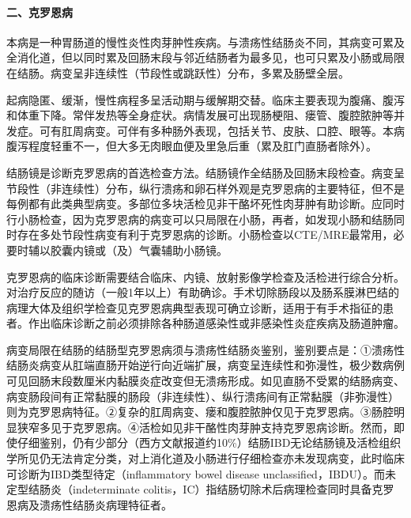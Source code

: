 \paragraph{二、克罗恩病}

本病是一种胃肠道的慢性炎性肉芽肿性疾病。与溃疡性结肠炎不同，其病变可累及全消化道，但以同时累及回肠末段与邻近结肠者为最多见，也可只累及小肠或局限在结肠。病变呈非连续性（节段性或跳跃性）分布，多累及肠壁全层。

起病隐匿、缓渐，慢性病程多呈活动期与缓解期交替。临床主要表现为腹痛、腹泻和体重下降。常伴发热等全身症状。病情发展可出现肠梗阻、瘘管、腹腔脓肿等并发症。可有肛周病变。可伴有多种肠外表现，包括关节、皮肤、口腔、眼等。本病腹泻程度轻重不一，但大多无肉眼血便及里急后重（累及肛门直肠者除外）。

结肠镜是诊断克罗恩病的首选检查方法。结肠镜作全结肠及回肠末段检查。病变呈节段性（非连续性）分布，纵行溃疡和卵石样外观是克罗恩病的主要特征，但不是每例都有此类典型病变。多部位多块活检见非干酪坏死性肉芽肿有助诊断。应同时行小肠检查，因为克罗恩病的病变可以只局限在小肠，再者，如发现小肠和结肠同时存在多处节段性病变有利于克罗恩病的诊断。小肠检查以CTE/MRE最常用，必要时辅以胶囊内镜或（及）气囊辅助小肠镜。

克罗恩病的临床诊断需要结合临床、内镜、放射影像学检查及活检进行综合分析。对治疗反应的随访（一般1年以上）有助确诊。手术切除肠段以及肠系膜淋巴结的病理大体及组织学检查见克罗恩病典型表现可确立诊断，适用于有手术指征的患者。作出临床诊断之前必须排除各种肠道感染性或非感染性炎症疾病及肠道肿瘤。

病变局限在结肠的结肠型克罗恩病须与溃疡性结肠炎鉴别，鉴别要点是：①溃疡性结肠炎病变从肛端直肠开始逆行向近端扩展，病变呈连续性和弥漫性，极少数病例可见回肠末段数厘米内黏膜炎症改变但无溃疡形成。如见直肠不受累的结肠病变、病变肠段间有正常黏膜的肠段（非连续性）、纵行溃疡间有正常黏膜（非弥漫性）则为克罗恩病特征。②复杂的肛周病变、瘘和腹腔脓肿仅见于克罗恩病。③肠腔明显狭窄多见于克罗恩病。④活检如见非干酪性肉芽肿支持克罗恩病诊断。然而，即使仔细鉴别，仍有少部分（西方文献报道约10\%）结肠IBD无论结肠镜及活检组织学所见仍无法肯定分类，对上消化道及小肠进行仔细检查亦未发现病变，此时临床可诊断为IBD类型待定（inflammatory
bowel disease unclassified，IBDU）。而未定型结肠炎（indeterminate
colitis，IC）指结肠切除术后病理检查同时具备克罗恩病及溃疡性结肠炎病理特征者。

